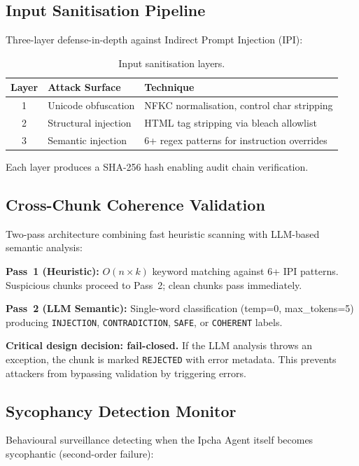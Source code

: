 \documentclass[11pt,a4paper]{article}
\begin{document}
\subsection{Input Sanitisation Pipeline}

Three-layer defense-in-depth against Indirect Prompt Injection (IPI):

\begin{table}[ht]
\centering
\caption{Input sanitisation layers.}
\label{tab:sanitisation}
\begin{tabular}{@{}cll@{}}
\toprule
\textbf{Layer} & \textbf{Attack Surface} & \textbf{Technique} \\
\midrule
1 & Unicode obfuscation   & NFKC normalisation, control char stripping \\
2 & Structural injection  & HTML tag stripping via bleach allowlist \\
3 & Semantic injection    & 6+ regex patterns for instruction overrides \\
\bottomrule
\end{tabular}
\end{table}

Each layer produces a SHA-256 hash enabling audit chain verification.

\subsection{Cross-Chunk Coherence Validation}

Two-pass architecture combining fast heuristic scanning with
LLM-based semantic analysis:

\textbf{Pass~1 (Heuristic):} $O(n \times k)$ keyword matching
against 6+ IPI patterns.  Suspicious chunks proceed to Pass~2; clean
chunks pass immediately.

\textbf{Pass~2 (LLM Semantic):} Single-word classification
(temp=0, max\_tokens=5) producing \texttt{INJECTION},
\texttt{CONTRADICTION}, \texttt{SAFE}, or \texttt{COHERENT} labels.

\textbf{Critical design decision: fail-closed.}  If the LLM analysis
throws an exception, the chunk is marked \texttt{REJECTED} with
error metadata.  This prevents attackers from bypassing validation by
triggering errors.

\subsection{Sycophancy Detection Monitor}

Behavioural surveillance detecting when the Ipcha Agent itself becomes
sycophantic (second-order failure):
\end{document}
